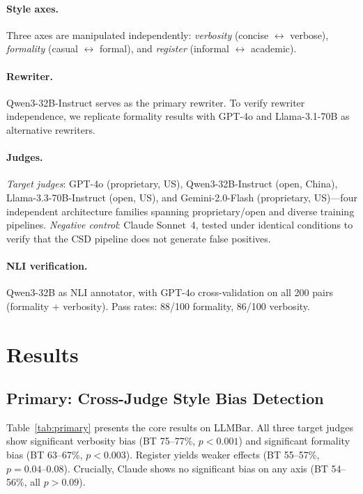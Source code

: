 \documentclass[11pt]{article}
\begin{document}
\paragraph{Style axes.}
Three axes are manipulated independently: \emph{verbosity} (concise $\leftrightarrow$ verbose), \emph{formality} (casual $\leftrightarrow$ formal), and \emph{register} (informal $\leftrightarrow$ academic).

\paragraph{Rewriter.}
Qwen3-32B-Instruct serves as the primary rewriter. To verify rewriter independence, we replicate formality results with GPT-4o and Llama-3.1-70B as alternative rewriters.

\paragraph{Judges.}
\emph{Target judges}: GPT-4o (proprietary, US), Qwen3-32B-Instruct (open, China), Llama-3.3-70B-Instruct (open, US), and Gemini-2.0-Flash (proprietary, US)---four independent architecture families spanning proprietary/open and diverse training pipelines.
\emph{Negative control}: Claude Sonnet~4, tested under identical conditions to verify that the CSD pipeline does not generate false positives.

\paragraph{NLI verification.}
Qwen3-32B as NLI annotator, with GPT-4o cross-validation on all 200 pairs (formality + verbosity). Pass rates: 88/100 formality, 86/100 verbosity.

\section{Results}
\label{sec:results}

\subsection{Primary: Cross-Judge Style Bias Detection}
\label{sec:primary}

Table~\ref{tab:primary} presents the core results on LLMBar.
All three target judges show significant verbosity bias (BT 75--77\%, $p < 0.001$) and significant formality bias (BT 63--67\%, $p < 0.003$).
Register yields weaker effects (BT 55--57\%, $p = 0.04$--$0.08$).
Crucially, Claude shows no significant bias on any axis (BT 54--56\%, all $p > 0.09$).
\end{document}
